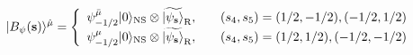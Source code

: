 \begin{equation}
 | B_\psi({\bf s}) \rangle^{\hat \mu}
 = \left\{
   \begin{array}{ll}
    \psi^{\bar \mu}_{-1/2} | 0 \rangle_{\rm NS}
     \otimes \widetilde{| \psi_{\bf s} \rangle}_{\rm R},
   &
    \quad (s_4, s_5) = (1/2, -1/2), (-1/2, 1/2)
   \\
    \psi^\mu_{-1/2} | 0 \rangle_{\rm NS}
     \otimes \widetilde{| \psi_{\bf s} \rangle}_{\rm R},
   &
    \quad (s_4, s_5) = (1/2, 1/2), (-1/2, -1/2)
   \end{array}
   \right.
\label{f-state}
\end{equation}

